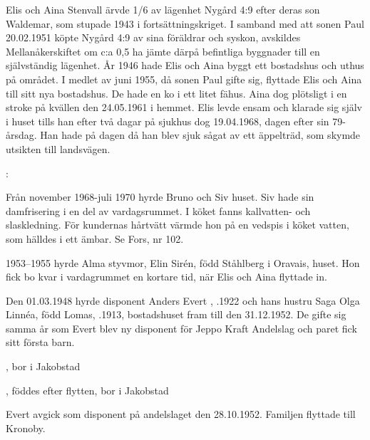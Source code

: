 %
Elis och Aina Stenvall ärvde 1/6 av lägenhet Nygård 4:9 efter deras son Waldemar, som stupade 1943 i fortsättningskriget. I samband med att sonen Paul 20.02.1951 köpte Nygård 4:9 av sina föräldrar och syskon, avskildes Mellanåkerskiftet om c:a 0,5 ha jämte därpå befintliga byggnader till en självständig lägenhet. År 1946 hade Elis och Aina byggt ett bostadshus och uthus på området. I medlet av juni 1955, då sonen Paul gifte sig, flyttade Elis och Aina till sitt nya bostadshus. De hade en ko i ett litet fähus. Aina dog plötsligt i en stroke på kvällen den 24.05.1961 i hemmet. Elis levde ensam och klarade sig själv i huset tills han efter två dagar på sjukhus dog 19.04.1968, dagen efter sin 79-årsdag. Han hade på dagen då han blev sjuk sågat av ett äppelträd, som skymde utsikten till landsvägen.


:

Från november 1968-juli 1970 hyrde Bruno och Siv  huset. Siv hade sin damfrisering i en del av vardagsrummet. I köket fanns kallvatten- och slaskledning. För kundernas hårtvätt värmde hon på en	vedspis i köket vatten, som hälldes i ett ämbar. Se Fors, nr 102.

1953--1955 hyrde Alma  styvmor, Elin Sirén, född Ståhlberg i Oravais, huset. Hon fick bo kvar i vardagrummet en kortare tid, när Elis och Aina flyttade in.

Den 01.03.1948 hyrde disponent Anders Evert , .1922 och hans hustru Saga Olga Linnéa, född Lomas, .1913, bostadshuset fram till den 31.12.1952. De gifte sig samma år som Evert blev ny disponent för Jeppo Kraft Andelslag och paret fick sitt första barn.
\begin{jhchildren}
  \item {}, bor i Jakobstad
  \item {}, föddes efter flytten, bor i Jakobstad
\end{jhchildren}
Evert avgick som disponent på andelslaget den 28.10.1952. Familjen flyttade till Kronoby.



%



